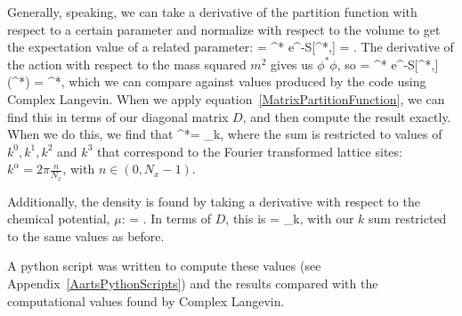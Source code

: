 \documentclass[../RotatingBosons.tex]{subfiles}
\begin{document}
Generally, speaking, we can take a derivative of the partition function with respect to a certain parameter and normalize with respect to the volume to get the expectation value of a related parameter:
\beq
\label{PartitionFunctionDerivatives}
  =  \int \CD \phi^{*} \CD \phi e^{-S[\phi^{*},\phi]} = \left\langle {}\right\rangle.
\eeq
The derivative of the action with respect to the mass squared $m^{2}$ gives us $\phi^{*}\phi$, so
\beq
{}  =  \int \CD \phi^{*} \CD \phi e^{-S[\phi^{*},\phi]}\left (\phi^{*}\phi \right) = \left\langle \phi^{*}\phi\right\rangle,
\eeq which we can compare against values produced by the code using Complex Langevin. When we apply equation~\ref{MatrixPartitionFunction}, we can find this in terms of our diagonal matrix $D$, and then compute the result exactly. When we do this, we find that 
\beq
\left\langle \phi^{*}\phi\right\rangle = \sum_{k},
\eeq where the sum is restricted to values of $k^{0},k^{1},k^{2}$ and $k^{3}$ that correspond to the Fourier transformed lattice sites: $k^{\alpha} = 2 \pi \frac{n}{N_{x}}$, with $n \in (0,N_{x}-1)$.

Additionally, the density is found by taking a derivative with respect to the chemical potential, $\mu$:
\beq
{}  =  \left\langle {} \right\rangle.
\eeq In terms of $D$, this is
\beq
\left\langle {} \right\rangle = \sum_{k},
\eeq with our $k$ sum restricted to the same values as before.

A python script was written to compute these values (see Appendix~\ref{AartsPythonScripts}) and the results compared with the computational values found by Complex Langevin.
\end{document}

